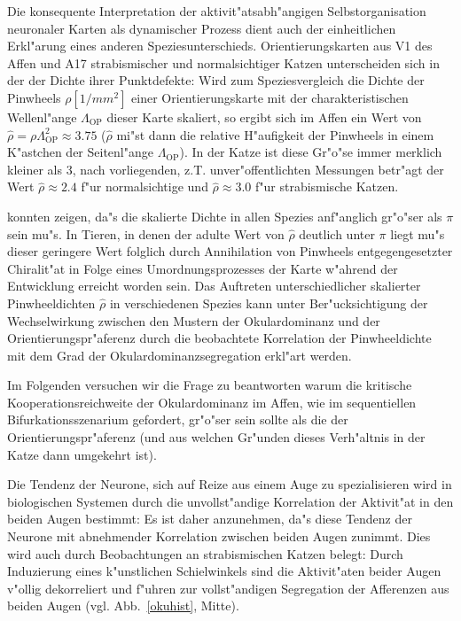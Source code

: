 Die konsequente Interpretation der aktivit"atsabh"angigen
Selbstorganisation neuronaler Karten als dynamischer Prozess dient auch der
einheitlichen Erkl"arung eines anderen Speziesunterschieds.
Orientierungskarten aus V1 des Affen und A17 strabismischer und
normalsichtiger Katzen unterscheiden sich in der der Dichte ihrer
Punktdefekte: Wird zum Speziesvergleich die Dichte der Pinwheels $\rho
[1/mm^2]$ einer Orientierungskarte mit der charakteristischen Wellenl"ange
$\Lambda_{\text{OP}}$ dieser Karte skaliert, so ergibt sich im Affen ein
Wert von $\hat{\rho}=\rho \Lambda_{\text{OP}}^2\approx 3.75$ ($\hat{\rho}$
mi"st dann die relative H"aufigkeit der Pinwheels in einem K"astchen der
Seitenl"ange $\Lambda_{\text{OP}}$). In der Katze ist diese Gr"o"se immer
merklich kleiner als $3$, nach vorliegenden, z.T. unver"offentlichten
Messungen betr"agt der Wert $\hat{\rho}\approx 2.4$ f"ur normalsichtige und
$\hat{\rho}\approx 3.0$ f"ur strabismische Katzen.

 konnten zeigen, da"s die skalierte Dichte in allen
Spezies anf"anglich gr"o"ser als $\pi$ sein mu"s. In Tieren, in denen der
adulte Wert von $\hat{\rho}$ deutlich unter $\pi$ liegt mu"s dieser
geringere Wert folglich durch Annihilation von Pinwheels entgegengesetzter
Chiralit"at in Folge eines Umordnungsprozesses der Karte w"ahrend der
Entwicklung erreicht worden sein. Das Auftreten unterschiedlicher
skalierter Pinwheeldichten $\hat{\rho}$ in verschiedenen Spezies kann unter
Ber"ucksichtigung der Wechselwirkung zwischen den Mustern der
Okulardominanz und der Orientierungspr"aferenz durch die beobachtete
Korrelation der Pinwheeldichte mit dem Grad der Okulardominanzsegregation
erkl"art werden.

Im Folgenden versuchen wir die Frage zu beantworten warum die kritische
Kooperationsreichweite der Okulardominanz im Affen, wie im sequentiellen
Bifurkationsszenarium gefordert, gr"o"ser sein sollte als die der
Orientierungspr"aferenz (und aus welchen Gr"unden dieses Verh"altnis in der
Katze dann umgekehrt ist).

Die Tendenz der Neurone, sich auf Reize aus einem Auge zu spezialisieren
wird in biologischen Systemen durch die unvollst"andige Korrelation der
Aktivit"at in den beiden Augen bestimmt: Es ist daher anzunehmen, da"s
diese Tendenz der Neurone mit abnehmender Korrelation zwischen beiden Augen
zunimmt.  Dies wird auch durch Beobachtungen an strabismischen Katzen
belegt: Durch Induzierung eines k"unstlichen Schielwinkels sind die
Aktivit"aten beider Augen v"ollig dekorreliert und f"uhren zur
vollst"andigen Segregation der Afferenzen aus beiden Augen
(vgl. Abb.~\ref{okuhist}, Mitte).

